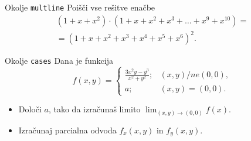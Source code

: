 \begin{frame}{Okolje \texttt{multline}}
	Poišči vse rešitve enačbe
	\begin{multline*}
		(1+x+x^2) \cdot (1+x+x^2+x^3+\ldots+x^9+x^{10}) = \\
	=(1+x+x^2+x^3+x^4+x^5+x^6)^2.
	\end{multline*}
\end{frame}

\begin{frame}{Okolje \texttt{cases}}
	Dana je funkcija
	$$
		f(x, y) = \begin{cases}
			\frac{3x^2y-y^3}{x^2+y^2}; & (x, y) /ne (0, 0), \\
			a; & (x,y) = (0, 0).
		\end{cases}
	$$
	\begin{itemize}
	\item Določi $a$, tako da izračunaš limito \( \lim_{(x,y)\to(0,0)} f(x). \)
	\item Izračunaj parcialna odvoda $f_x(x,y)$ in $f_y(x,y)$.
	\end{itemize}
\end{frame}
